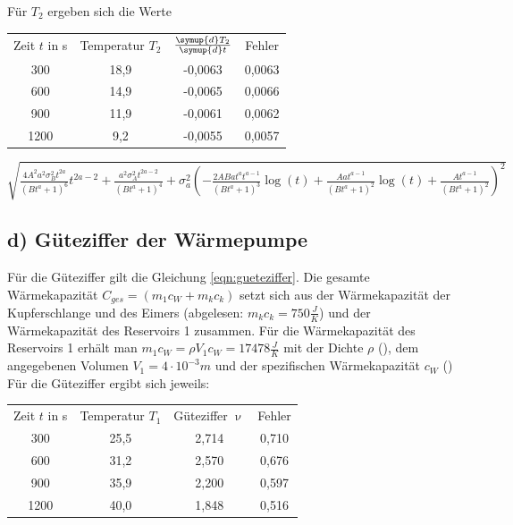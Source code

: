 Für $T_2$ ergeben sich die Werte
\begin{table}
\begin{tabular}{cccc}
	Zeit $t$ in s & Temperatur $T_2$ & $\frac{\symup{d}T_2}{\symup{d}t}$ & Fehler \\
	300 & 18,9 & -0,0063 & 0,0063 \\
	600 & 14,9 & -0,0065 & 0,0066 \\
	900 & 11,9 & -0,0061 & 0,0062 \\
	1200 & 9,2 & -0,0055 & 0,0057 \\
\end{tabular}
\end{table}

$\sqrt{\frac{4 A^{2} a^{2} \sigma_{B}^{2} t^{2 a}}{\left(B t^{a} + 1\right)^{6}} t^{2 a - 2} + \frac{a^{2} \sigma_{A}^{2} t^{2 a - 2}}{\left(B t^{a} + 1\right)^{4}} + \sigma_{a}^{2} \left(- \frac{2 A B a t^{a} t^{a - 1}}{\left(B t^{a} + 1\right)^{3}} \log{\left (t \right )} + \frac{A a t^{a - 1}}{\left(B t^{a} + 1\right)^{2}} \log{\left (t \right )} + \frac{A t^{a - 1}}{\left(B t^{a} + 1\right)^{2}}\right)^{2}}$
\newpage


\subsection{d) Güteziffer der Wärmepumpe}

Für die Güteziffer gilt die Gleichung \eqref{eqn:gueteziffer}.
Die gesamte Wärmekapazität $C_{ges} = (m_1 c_W + m_k c_k)$ setzt sich aus der Wärmekapazität der Kupferschlange und des Eimers (abgelesen: $m_k c_k = 750 \frac{J}{K}$) und der Wärmekapazität des Reservoirs 1 zusammen.
Für die Wärmekapazität des Reservoirs 1 erhält man $m_1 c_W = \rho V_1 c_W = 17478 \frac{J}{K}$ mit der Dichte $\rho$ (\cite{geschke}), dem angegebenen Volumen $V_1 = 4 \cdot 10^{-3} m$ und der spezifischen Wärmekapazität $c_W$ (\cite{geschke})
Für die Güteziffer ergibt sich jeweils:
\begin{table}
\begin{tabular}{cccc}
	Zeit $t$ in s & Temperatur $T_1$ & Güteziffer $\upnu$ & Fehler\\
	300 & 25,5 & 2,714 & 0,710 \\
	600 & 31,2 & 2,570 & 0,676 \\
	900 & 35,9 & 2,200 & 0,597 \\
	1200 & 40,0 & 1,848 & 0,516 \\
\end{tabular}
\end{table}

